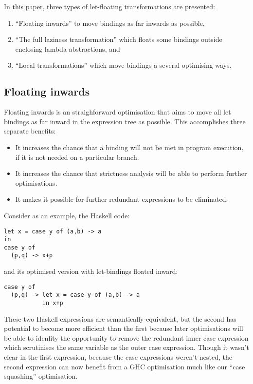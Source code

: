 In this paper, three types of let-floating transformations are presented:
\begin{enumerate}
\item ``Floating inwards'' to move bindings as far inwards as possible,
\item ``The full laziness transformation'' which floats some bindings outside enclosing lambda abstractions, and
\item ``Local transformations'' which move bindings a several optimising ways.\citep{jones1996}
\end{enumerate}

\subsection*{Floating inwards}

Floating inwards is an straighforward optimisation that aims to move all let bindings as far inward in the expression tree as possible. This accomplishes three separate benefits:
\begin{itemize}
\item It increases the chance that a binding will not be met in program execution, if it is not needed on a particular branch.
\item It increases the chance that strictness analysis will be able to perform further optimisations.
\item It makes it possible for further redundant expressions to be eliminated.\citep{jones1996}
\end{itemize}

Consider as an example, the Haskell code:
\begin{lstlisting}
let x = case y of (a,b) -> a
in
case y of
  (p,q) -> x+p
\end{lstlisting}

and its optimised version with let-bindings floated inward:
\begin{lstlisting}
case y of
  (p,q) -> let x = case y of (a,b) -> a
           in x+p
\end{lstlisting}

These two Haskell expressions are semantically-equivalent, but the second has potential to become more efficient than the first because later optimisations will be able to idenfity the opportunity to remove the redundant inner case expression which scrutinises the same variable as the outer case expression.\citep{jones1996} Though it wasn't clear in the first expression, because the case expressions weren't nested, the second expression can now benefit from a GHC optimisation much like our ``case squashing'' optimisation.

